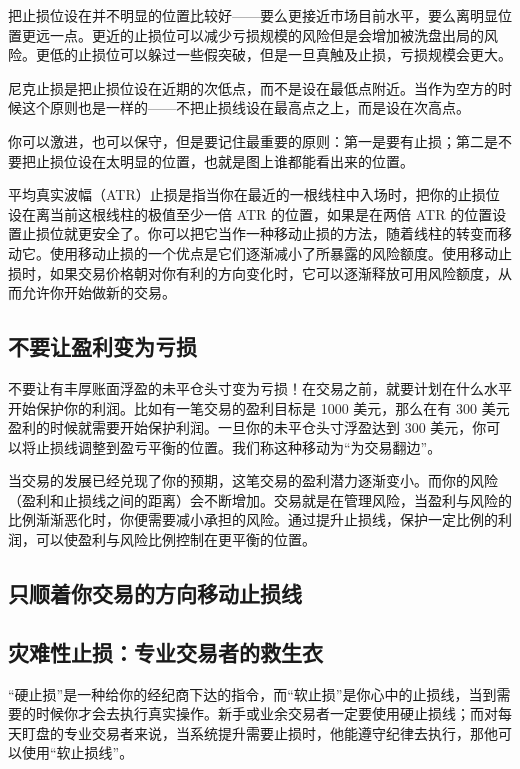 把止损位设在并不明显的位置比较好——要么更接近市场目前水平，要么离明显位置更远一点。更近的止损位可以减少亏损规模的风险但是会增加被洗盘出局的风险。更低的止损位可以躲过一些假突破，但是一旦真触及止损，亏损规模会更大。

尼克止损是把止损位设在近期的次低点，而不是设在最低点附近。当作为空方的时候这个原则也是一样的——不把止损线设在最高点之上，而是设在次高点。

你可以激进，也可以保守，但是要记住最重要的原则：第一是要有止损；第二是不要把止损位设在太明显的位置，也就是图上谁都能看出来的位置。

平均真实波幅（ATR）止损是指当你在最近的一根线柱中入场时，把你的止损位设在离当前这根线柱的极值至少一倍 ATR 的位置，如果是在两倍 ATR 的位置设置止损位就更安全了。你可以把它当作一种移动止损的方法，随着线柱的转变而移动它。使用移动止损的一个优点是它们逐渐减小了所暴露的风险额度。使用移动止损时，如果交易价格朝对你有利的方向变化时，它可以逐渐释放可用风险额度，从而允许你开始做新的交易。
\subsection*{不要让盈利变为亏损}
不要让有丰厚账面浮盈的未平仓头寸变为亏损！在交易之前，就要计划在什么水平开始保护你的利润。比如有一笔交易的盈利目标是 1000 美元，那么在有 300 美元盈利的时候就需要开始保护利润。一旦你的未平仓头寸浮盈达到 300 美元，你可以将止损线调整到盈亏平衡的位置。我们称这种移动为“为交易翻边”。

当交易的发展已经兑现了你的预期，这笔交易的盈利潜力逐渐变小。而你的风险（盈利和止损线之间的距离）会不断增加。交易就是在管理风险，当盈利与风险的比例渐渐恶化时，你便需要减小承担的风险。通过提升止损线，保护一定比例的利润，可以使盈利与风险比例控制在更平衡的位置。
\subsection*{只顺着你交易的方向移动止损线}
\subsection*{灾难性止损：专业交易者的救生衣}
“硬止损”是一种给你的经纪商下达的指令，而“软止损”是你心中的止损线，当到需要的时候你才会去执行真实操作。新手或业余交易者一定要使用硬止损线；而对每天盯盘的专业交易者来说，当系统提升需要止损时，他能遵守纪律去执行，那他可以使用“软止损线”。
